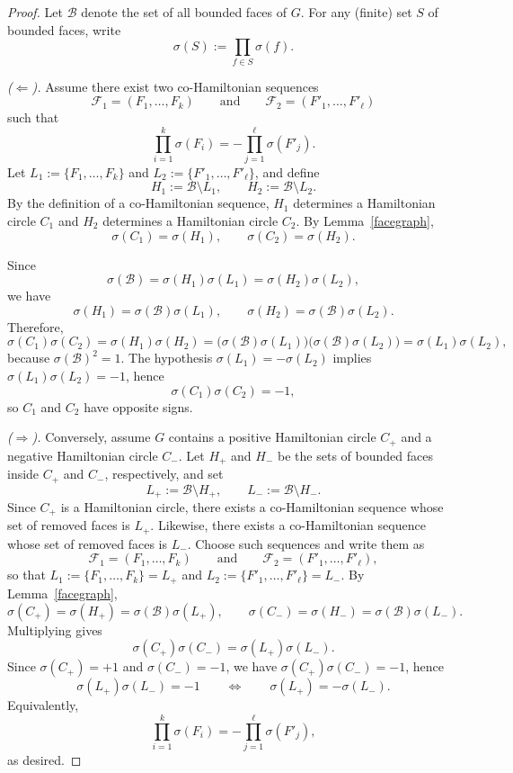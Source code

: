 \documentclass[12pt]{amsart}
\theoremstyle{theorem}%
\theoremstyle{definition}%
\begin{document}
\begin{proof}
Let $\mathcal{B}$ denote the set of all bounded faces of $G$.
For any (finite) set $S$ of bounded faces, write
\[
\sigma(S):=\prod_{f\in S}\sigma(f).
\]

\medskip
\noindent\emph{($\Leftarrow$).}
Assume there exist two co-Hamiltonian sequences
\[
\mathcal{F}_1=(F_1,\dots,F_k)
\qquad\text{and}\qquad
\mathcal{F}_2=(F'_1,\dots,F'_\ell)
\]
such that
\[
\prod_{i=1}^{k} \sigma(F_i)=-\prod_{j=1}^{\ell} \sigma(F'_j).
\]
Let $L_1:=\{F_1,\dots,F_k\}$ and $L_2:=\{F'_1,\dots,F'_\ell\}$, and define
\[
H_1:=\mathcal{B}\setminus L_1,
\qquad
H_2:=\mathcal{B}\setminus L_2.
\]
By the definition of a co-Hamiltonian sequence, $H_1$ determines a Hamiltonian circle $C_1$ and
$H_2$ determines a Hamiltonian circle $C_2$.
By Lemma~\ref{facegraph},
\[
\sigma(C_1)=\sigma(H_1),
\qquad
\sigma(C_2)=\sigma(H_2).
\]

Since 
\[
\sigma(\mathcal{B})=\sigma(H_1)\sigma(L_1)=\sigma(H_2)\sigma(L_2),
\]
 we have
\[
\sigma(H_1)=\sigma(\mathcal{B})\sigma(L_1),
\qquad
\sigma(H_2)=\sigma(\mathcal{B})\sigma(L_2).
\]
Therefore,
\[
\sigma(C_1)\sigma(C_2)
=\sigma(H_1)\sigma(H_2)
=\bigl(\sigma(\mathcal{B})\sigma(L_1)\bigr)\bigl(\sigma(\mathcal{B})\sigma(L_2)\bigr)
=\sigma(L_1)\sigma(L_2),
\]
because $\sigma(\mathcal{B})^2=1$.
The hypothesis $\sigma(L_1)=-\sigma(L_2)$ implies $\sigma(L_1)\sigma(L_2)=-1$, hence
\[
\sigma(C_1)\sigma(C_2)=-1,
\]
so $C_1$ and $C_2$ have opposite signs.

\medskip
\noindent\emph{($\Rightarrow$).}
Conversely, assume $G$ contains a positive Hamiltonian circle $C_+$ and a negative Hamiltonian circle $C_-$.
Let $H_+$ and $H_-$ be the sets of bounded faces inside $C_+$ and $C_-$, respectively, and set
\[
L_+:=\mathcal{B}\setminus H_+,
\qquad
L_-:=\mathcal{B}\setminus H_-.
\]
Since $C_+$ is a Hamiltonian circle, there exists a co-Hamiltonian sequence whose set of removed faces is $L_+$.
Likewise, there exists a co-Hamiltonian sequence whose set of removed faces is $L_-$.
Choose such sequences and write them as
\[
\mathcal{F}_1=(F_1,\dots,F_k)
\qquad\text{and}\qquad
\mathcal{F}_2=(F'_1,\dots,F'_\ell),
\]
so that $L_1:=\{F_1,\dots,F_k\}=L_+$ and $L_2:=\{F'_1,\dots,F'_\ell\}=L_-$.
By Lemma~\ref{facegraph},
\[
\sigma(C_+)=\sigma(H_+)=\sigma(\mathcal{B})\sigma(L_+),
\qquad
\sigma(C_-)=\sigma(H_-)=\sigma(\mathcal{B})\sigma(L_-).
\]
Multiplying gives
\[
\sigma(C_+)\sigma(C_-)=\sigma(L_+)\sigma(L_-).
\]
Since $\sigma(C_+)=+1$ and $\sigma(C_-)=-1$, we have $\sigma(C_+)\sigma(C_-)=-1$, hence
\[
\sigma(L_+)\sigma(L_-)=-1
\qquad\Longleftrightarrow\qquad
\sigma(L_+)=-\sigma(L_-).
\]
Equivalently,
\[
\prod_{i=1}^{k} \sigma(F_i)=-\prod_{j=1}^{\ell} \sigma(F'_j),
\]
as desired.
\end{proof}
\end{document}
